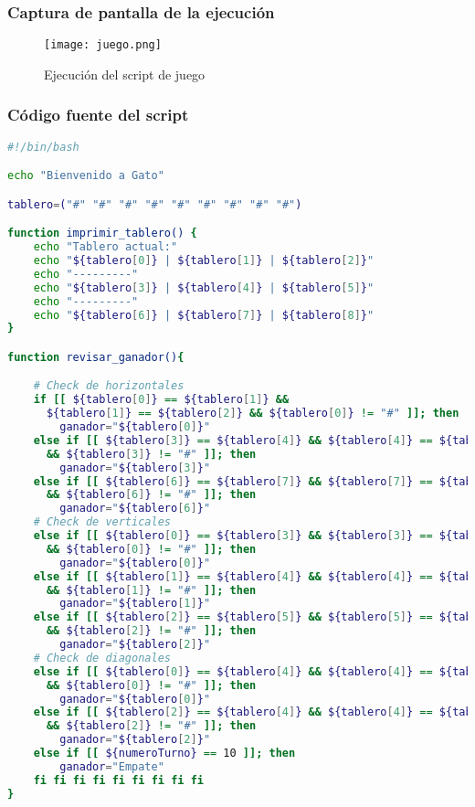 \documentclass{article}
\begin{document}
\subsubsection{Captura de pantalla de la ejecución}

\begin{figure}[h!]
\centering
\texttt{[image: juego.png]}
\caption{Ejecución del script de juego}
\end{figure}

\subsubsection{Código fuente del script}

\begin{lstlisting}[language=bash]
#!/bin/bash

echo "Bienvenido a Gato"

tablero=("#" "#" "#" "#" "#" "#" "#" "#" "#")

function imprimir_tablero() {
    echo "Tablero actual:"
    echo "${tablero[0]} | ${tablero[1]} | ${tablero[2]}"
    echo "---------"
    echo "${tablero[3]} | ${tablero[4]} | ${tablero[5]}"
    echo "---------"
    echo "${tablero[6]} | ${tablero[7]} | ${tablero[8]}"
}

function revisar_ganador(){

    # Check de horizontales
    if [[ ${tablero[0]} == ${tablero[1]} && 
      ${tablero[1]} == ${tablero[2]} && ${tablero[0]} != "#" ]]; then
        ganador="${tablero[0]}"
    else if [[ ${tablero[3]} == ${tablero[4]} && ${tablero[4]} == ${tablero[5]}
      && ${tablero[3]} != "#" ]]; then
        ganador="${tablero[3]}"
    else if [[ ${tablero[6]} == ${tablero[7]} && ${tablero[7]} == ${tablero[8]} 
      && ${tablero[6]} != "#" ]]; then
        ganador="${tablero[6]}"
    # Check de verticales
    else if [[ ${tablero[0]} == ${tablero[3]} && ${tablero[3]} == ${tablero[6]} 
      && ${tablero[0]} != "#" ]]; then
        ganador="${tablero[0]}"
    else if [[ ${tablero[1]} == ${tablero[4]} && ${tablero[4]} == ${tablero[7]} 
      && ${tablero[1]} != "#" ]]; then
        ganador="${tablero[1]}"
    else if [[ ${tablero[2]} == ${tablero[5]} && ${tablero[5]} == ${tablero[8]} 
      && ${tablero[2]} != "#" ]]; then
        ganador="${tablero[2]}"
    # Check de diagonales
    else if [[ ${tablero[0]} == ${tablero[4]} && ${tablero[4]} == ${tablero[8]} 
      && ${tablero[0]} != "#" ]]; then
        ganador="${tablero[0]}"
    else if [[ ${tablero[2]} == ${tablero[4]} && ${tablero[4]} == ${tablero[6]} 
      && ${tablero[2]} != "#" ]]; then
        ganador="${tablero[2]}"
    else if [[ ${numeroTurno} == 10 ]]; then
        ganador="Empate"
    fi fi fi fi fi fi fi fi fi
}


\end{lstlisting}
\end{document}
